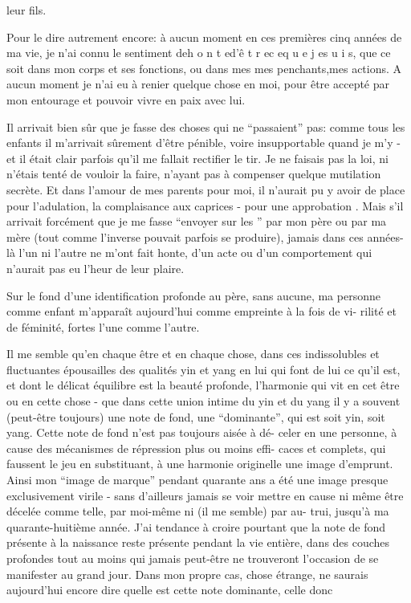 leur fils.

Pour le dire autrement encore: à aucun moment en ces premières cinq années
de ma vie, je n'ai connu le sentiment de\quad h o n t e\quad d'\quad ê t r e\quad c e\quad q u e\quad
j e\quad s u i s\quad, que ce soit dans mon corps et ses fonctions, ou dans mes 
mes penchants,mes actions. A aucun moment je n'ai eu à renier quelque chose en
moi, pour être accepté par mon entourage et pouvoir vivre en paix avec lui.

Il arrivait bien sûr que je fasse des choses qui ne ``passaient'' pas: comme
tous les enfants il m'arrivait sûrement d'être pénible, voire insupportable
quand je m'y  - et il était clair parfois qu'il me fallait rectifier le
tir. Je ne faisais pas la loi, ni n'étais tenté de vouloir la faire, n'ayant pas
à compenser quelque mutilation secrète. Et dans l'amour de mes parents pour moi,
il n'aurait pu y avoir de place pour l'adulation, la complaisance aux caprices -
pour une approbation . Mais s'il arrivait forcément que je me
fasse ``envoyer sur les '' par mon père ou par ma mère (tout comme l'inverse
pouvait parfois se produire), jamais dans ces années-là l'un ni l'autre ne m'ont
fait honte, d'un acte ou d'un comportement qui n'aurait pas eu l'heur de leur
plaire.

Sur le fond d'une identification profonde au père, sans  aucune,
ma personne comme enfant m'apparaît aujourd'hui comme empreinte à la fois de vi-\newline
rilité et de féminité, fortes l'une comme l'autre.

Il me semble qu'en chaque être et en chaque chose, dans ces indissolubles
et fluctuantes épousailles des qualités yin et yang en lui qui font de lui ce
qu'il est, et dont le délicat équilibre est la beauté profonde, l'harmonie qui
vit en cet être ou en cette chose - que dans cette union intime du yin et du
yang il y a souvent (peut-être toujours) une note de fond, une ``dominante'',
qui est soit yin, soit yang. Cette note de fond n'est pas toujours aisée à dé-\newline
celer en une personne, à cause des mécanismes de répression plus ou moins effi-\newline
caces et complets, qui faussent le jeu en substituant, à une harmonie originelle
une image d'emprunt. Ainsi mon ``image de marque'' pendant quarante ans a été une
image presque exclusivement virile - sans d'ailleurs jamais se voir mettre en
cause ni même être décelée comme telle, par moi-même ni (il me semble) par au-\newline
trui, jusqu'à ma quarante-huitième année. J'ai tendance à croire pourtant que
la note de fond présente à la naissance reste présente pendant la vie entière,
dans des couches profondes tout au moins qui jamais peut-être ne trouveront
l'occasion de se manifester au grand jour. Dans mon propre cas, chose étrange, 
ne saurais aujourd'hui encore dire quelle est cette note dominante, celle donc
